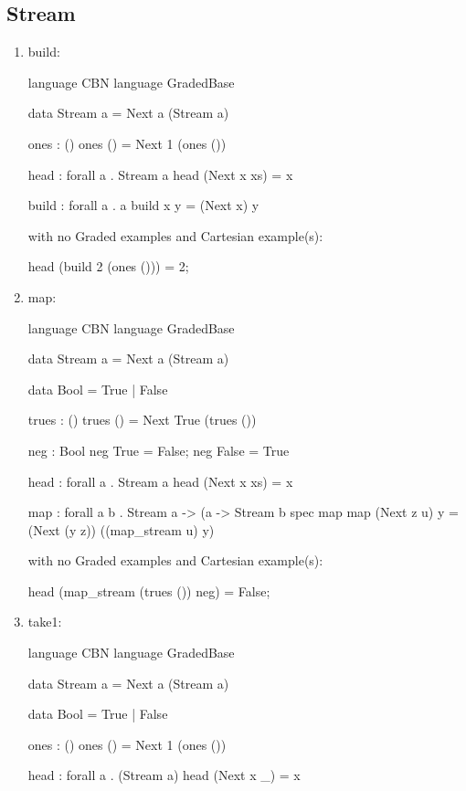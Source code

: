 \subsection{Stream}
\begin{enumerate}
\item build: 
\begin{granule}
language CBN 
language GradedBase

data Stream a = Next a (Stream a) 

ones : () %
ones () = Next 1 (ones ())

head : forall a . Stream a %
head (Next x xs) = x

build : forall a . a %
build x y = (Next x) y
\end{granule}
with no Graded examples and Cartesian example(s):
\begin{granule}
head (build 2 (ones ())) = 2;
\end{granule}
\item map: 
\begin{granule}
language CBN
language GradedBase 

data Stream a = Next a (Stream a) 

data Bool = True | False

trues : () %
trues () = Next True (trues ())

neg : Bool %
neg True = False; 
neg False = True

head : forall a . Stream a %
head (Next x xs) = x

map : forall a b 
    . Stream a %
    -> (a %
    -> Stream b
spec 
    map %
map (Next z u) y = (Next (y z)) ((map_stream u) y)
\end{granule}
with no Graded examples and Cartesian example(s):
\begin{granule}
head (map_stream (trues ()) neg) = False;
\end{granule}
\item take1: 
\begin{granule}
language CBN 
language GradedBase 
    
data Stream a = Next a (Stream a) 

data Bool = True | False
    
ones : () %
ones () = Next 1 (ones ())
    
head : forall a . (Stream a) %
head (Next x _) = x
    

\end{granule}
\end{enumerate}
